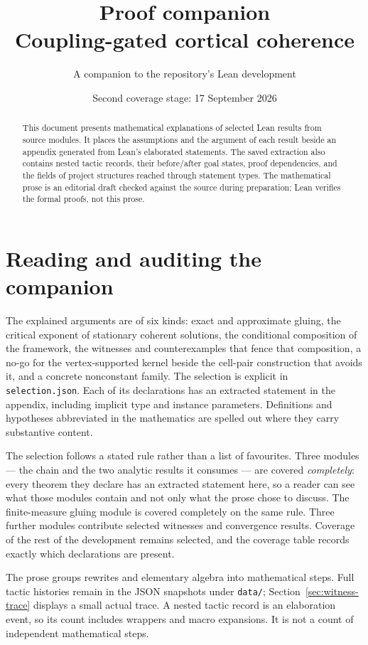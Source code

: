 \documentclass[11pt,a4paper]{article}
\title{Proof companion\\\large Coupling-gated cortical coherence}
\author{A companion to the repository's Lean development}
\date{Second coverage stage: 17 September 2026}
\begin{document}
\maketitle
\begin{abstract}
This document presents mathematical explanations of
\CompanionTheoremCount{} selected Lean results from
\CompanionModuleCount{} source modules. It places the assumptions and the
argument of each result beside an appendix generated from Lean's elaborated
statements. The saved extraction also contains
\CompanionTacticRecordCount{} nested tactic records, their before/after goal
states, proof dependencies, and the fields of project structures reached through
statement types. The mathematical prose is an editorial draft checked against
the source during preparation; Lean verifies the formal proofs, not this prose.
\end{abstract}

\tableofcontents

\section{Reading and auditing the companion}
The explained arguments are of six kinds: exact and approximate gluing, the
critical exponent of stationary coherent solutions, the conditional composition
of the framework, the witnesses and counterexamples that fence that composition,
a no-go for the vertex-supported kernel beside the cell-pair construction that
avoids it, and a concrete nonconstant family. The selection is explicit in \nolinkurl{selection.json}.
Each of its declarations has an extracted statement in the appendix, including
implicit type and instance parameters. Definitions and hypotheses abbreviated in
the mathematics are spelled out where they carry substantive content.

The selection follows a stated rule rather than a list of favourites. Three
modules --- the chain and the two analytic results it consumes --- are covered
\emph{completely}: every theorem they declare has an extracted statement here,
so a reader can see what those modules contain and not only what the prose
chose to discuss. The finite-measure gluing module is covered completely on the
same rule. Three further modules contribute selected witnesses and convergence
results. Coverage of the rest of the development remains selected, and the
coverage table records exactly which declarations are present.

The prose groups rewrites and elementary algebra into mathematical steps.
Full tactic histories remain in the JSON snapshots under \nolinkurl{data/};
Section~\ref{sec:witness-trace} displays a small actual trace. A nested tactic
record is an elaboration event, so its count includes wrappers and macro
expansions. It is not a count of independent mathematical steps.
\end{document}
